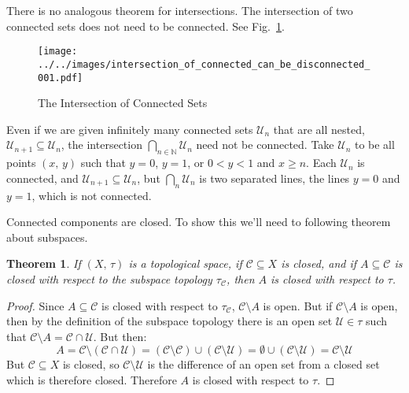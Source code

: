\documentclass{article}
\theoremstyle{plain}
\newtheorem{theorem}{Theorem}[section]
\theoremstyle{normal}
\begin{document}
        There is no analogous theorem for intersections. The intersection
        of two connected sets does not need to be connected. See
        Fig.~\ref{fig:intersection_of_connected_can_be_disconnected_001}.
        \begin{figure}
            \centering
            \texttt{[image: ../../images/intersection\_of\_connected\_can\_be\_disconnected\_001.pdf]}
            \caption{The Intersection of Connected Sets}
            \label{fig:intersection_of_connected_can_be_disconnected_001}
        \end{figure}
        Even if we are given infinitely many connected sets
        $\mathcal{U}_{n}$ that are all nested,
        $\mathcal{U}_{n+1}\subseteq\mathcal{U}_{n}$, the intersection
        $\bigcap_{n\in\mathbb{N}}\mathcal{U}_{n}$ need not be connected.
        Take $\mathcal{U}_{n}$ to be all points $(x,\,y)$ such that
        $y=0$, $y=1$, or $0<y<1$ and $x\geq{n}$. Each $\mathcal{U}_{n}$ is
        connected, and $\mathcal{U}_{n+1}\subseteq\mathcal{U}_{n}$, but
        $\bigcap_{n}\mathcal{U}_{n}$ is two separated lines, the lines
        $y=0$ and $y=1$, which is not connected.
        \par\hfill\par
        Connected components are closed. To show this we'll need to following
        theorem about subspaces.
        \begin{theorem}
            If $(X,\,\tau)$ is a topological space, if $\mathcal{C}\subseteq{X}$
            is closed, and if $A\subseteq\mathcal{C}$ is closed with respect
            to the subspace topology $\tau_{\mathcal{C}}$, then $A$ is closed
            with respect to $\tau$.
        \end{theorem}
        \begin{proof}
            Since $A\subseteq\mathcal{C}$ is closed with respect to
            $\tau_{\mathcal{C}}$, $\mathcal{C}\setminus{A}$ is open. But
            if $\mathcal{C}\setminus{A}$ is open, then by the definition of the
            subspace topology there is an open set $\mathcal{U}\in\tau$ such
            that $\mathcal{C}\setminus{A}=\mathcal{C}\cap\mathcal{U}$.
            But then:
            \begin{equation}
                A=\mathcal{C}\setminus(\mathcal{C}\cap\mathcal{U})
                    =(\mathcal{C}\setminus\mathcal{C})
                        \cup(\mathcal{C}\setminus\mathcal{U})
                    =\emptyset\cup(\mathcal{C}\setminus\mathcal{U})
                    =\mathcal{C}\setminus\mathcal{U}
            \end{equation}
            But $\mathcal{C}\subseteq{X}$ is closed, so
            $\mathcal{C}\setminus\mathcal{U}$ is the difference of an open set
            from a closed set which is therefore closed. Therefore $A$ is
            closed with respect to $\tau$.
        \end{proof}
\end{document}
